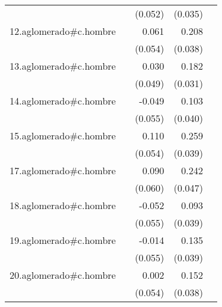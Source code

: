 {\begin{longtable}{l*{4}{D{.}{.}{-1}}}
            &                     &     (0.052)         &     (0.035)         &                     \\
\addlinespace
12.aglomerado#c.hombre&                     &       0.061         &       0.208\sym{***}&                     \\
            &                     &     (0.054)         &     (0.038)         &                     \\
\addlinespace
13.aglomerado#c.hombre&                     &       0.030         &       0.182\sym{***}&                     \\
            &                     &     (0.049)         &     (0.031)         &                     \\
\addlinespace
14.aglomerado#c.hombre&                     &      -0.049         &       0.103\sym{*}  &                     \\
            &                     &     (0.055)         &     (0.040)         &                     \\
\addlinespace
15.aglomerado#c.hombre&                     &       0.110\sym{*}  &       0.259\sym{***}&                     \\
            &                     &     (0.054)         &     (0.039)         &                     \\
\addlinespace
17.aglomerado#c.hombre&                     &       0.090         &       0.242\sym{***}&                     \\
            &                     &     (0.060)         &     (0.047)         &                     \\
\addlinespace
18.aglomerado#c.hombre&                     &      -0.052         &       0.093\sym{*}  &                     \\
            &                     &     (0.055)         &     (0.039)         &                     \\
\addlinespace
19.aglomerado#c.hombre&                     &      -0.014         &       0.135\sym{***}&                     \\
            &                     &     (0.055)         &     (0.039)         &                     \\
\addlinespace
20.aglomerado#c.hombre&                     &       0.002         &       0.152\sym{***}&                     \\
            &                     &     (0.054)         &     (0.038)         &                     \\

\end{longtable}}
